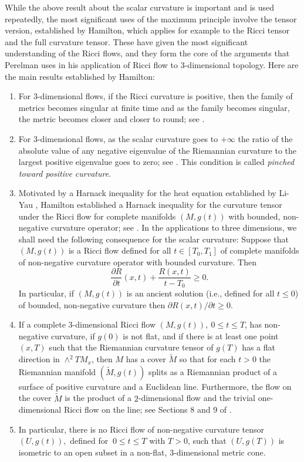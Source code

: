 While the above result about the scalar curvature is important and
is used repeatedly, the most significant uses of the maximum
principle involve the tensor version, established by Hamilton, which
applies for example to the Ricci tensor and the full curvature
tensor.  These have given the most significant understanding of the
Ricci flows, and they form the core of the arguments that Perelman
uses in his application of Ricci flow to $3$-dimensional topology.
Here are the main results established by Hamilton:

\begin{enumerate}
\item[(1)] For $3$-dimensional flows, if the Ricci curvature is positive,
then the family of metrics becomes singular at finite time and as
the family becomes singular, the metric becomes closer and closer to
round; see \cite{Hamilton3MPRC}.
\item[(2)] For $3$-dimensional flows, as the scalar curvature goes to $+\infty$
the ratio of the absolute value of any negative eigenvalue of the
Riemannian curvature to the largest positive eigenvalue goes to
zero; see \cite{HamiltonNSRF3M}. This condition is called {\em
pinched toward positive curvature}.
\item[(3)] Motivated by a Harnack inequality for the heat equation established
by Li-Yau \cite{LiYau}, Hamilton established a Harnack
inequality for the
curvature tensor under the Ricci flow for complete manifolds
$(M,g(t))$  with bounded, non-negative curvature operator; see
\cite{Hamiltonharnack}. In the applications to three dimensions, we
shall need the following consequence for the scalar curvature:
Suppose that $(M,g(t))$ is  a Ricci flow defined for all $t\in
[T_0,T_1]$ of complete manifolds of non-negative curvature operator
with bounded curvature. Then
$$\frac{\partial R}{\partial t}(x,t)+\frac{R(x,t)}{t-T_0}\ge 0.$$
In particular,
 if $(M,g(t))$ is an ancient solution (i.e.,
defined for all $t\le 0$) of bounded, non-negative curvature then
$\partial R(x,t)/\partial t\ge 0$.
\item[(4)] If a complete $3$-dimensional Ricci flow
$(M,g(t)),\ 0\le t\le T$, has non-negative curvature, if $g(0)$ is
not flat, and if there is at least one point $(x,T)$ such that the
Riemannian curvature tensor of $g(T)$ has a flat direction in
$\wedge^2TM_x$, then $M$ has a cover $\widetilde M$ so that for each
$t>0$ the Riemannian manifold $(\widetilde M,g(t))$ splits as a
Riemannian product of a surface of positive curvature and a
Euclidean line. Furthermore, the flow on the cover $\widetilde M$ is
the product of a $2$-dimensional flow and the trivial
one-dimensional Ricci flow on the line; see Sections 8 and 9 of
\cite{Hamilton4MPCO}.
\item[(5)] In particular, there is no Ricci flow of non-negative curvature tensor
$(U,g(t)),$ defined for $\ 0\le t\le T$ with $T>0$, such that
$(U,g(T))$ is isometric to an open subset in a non-flat,
$3$-dimensional metric cone.
\end{enumerate}


